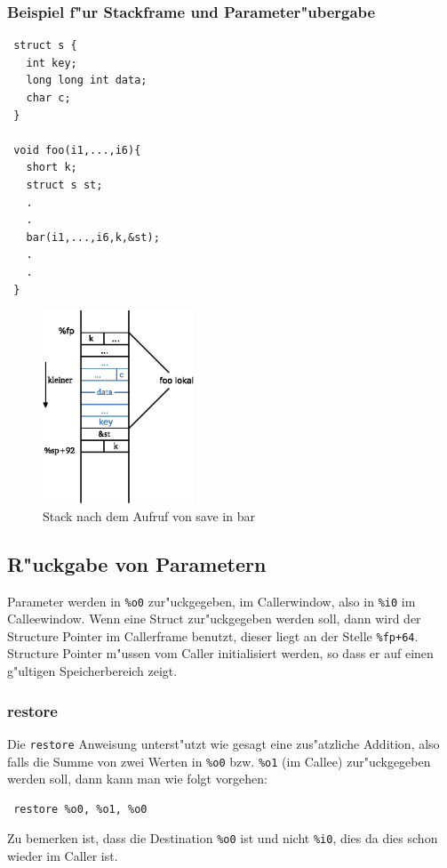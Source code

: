 \documentclass[german, 10pt, a4paper, twocolumn]{scrartcl}
\begin{document}
\subsubsection{Beispiel f"ur Stackframe und Parameter"ubergabe}

\begin{verbatim}
 struct s {
   int key;
   long long int data;
   char c;
 }

 void foo(i1,...,i6){
   short k;
   struct s st;
   .
   .
   bar(i1,...,i6,k,&st);
   .
   .
 }
\end{verbatim}

\begin{figure}[hbt]
 \begin{center}
 	\includegraphics[width=0.4\textwidth]{stack_beispiel.eps}
 \end{center}
 \label{stack_beispiel}
 \caption{Stack nach dem Aufruf von save in bar}
\end{figure}

\subsection{R"uckgabe von Parametern}

Parameter werden in \verb#%o0# zur"uckgegeben, im Callerwindow, also in \verb#%i0# im Calleewindow. Wenn eine Struct zur"uckgegeben werden soll, dann wird der Structure Pointer im Callerframe benutzt, dieser liegt an der Stelle \verb#%fp+64#. Structure Pointer m"ussen vom Caller initialisiert werden, so dass er auf einen g"ultigen Speicherbereich zeigt.

\subsubsection{restore}

Die \verb#restore# Anweisung unterst"utzt wie gesagt eine zus"atzliche Addition, also falls die Summe von zwei Werten in \verb#%o0# bzw. \verb#%o1# (im Callee) zur"uckgegeben werden soll, dann kann man wie folgt vorgehen:
\begin{verbatim}
 restore %o0, %o1, %o0
\end{verbatim}
Zu bemerken ist, dass die Destination \verb#%o0# ist und nicht \verb#%i0#, dies da dies schon wieder im Caller ist.
\end{document}
